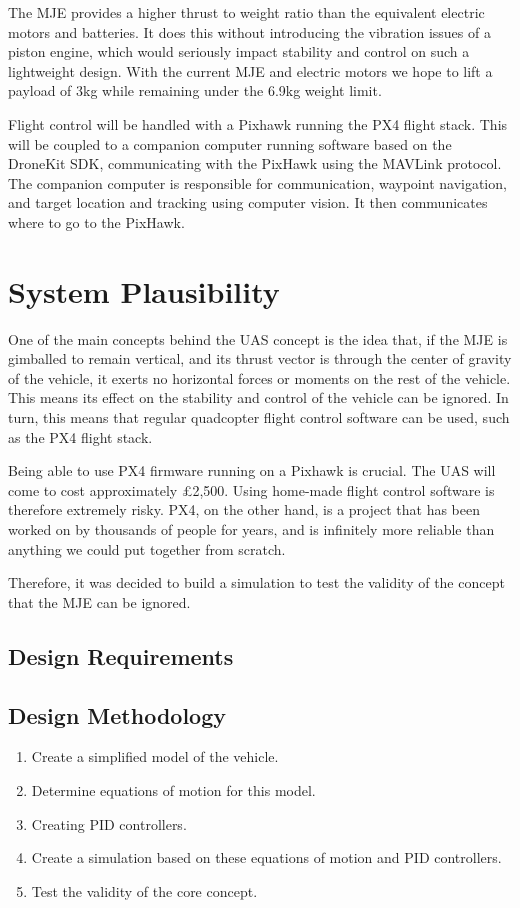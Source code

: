 \documentclass[10pt]{article}
\begin{document}
The MJE provides a higher thrust to weight ratio than the equivalent electric motors and batteries. It does this without introducing the vibration issues of a piston engine, which would seriously impact stability and control on such a lightweight design. With the current MJE and electric motors we hope to lift a payload of 3kg while remaining under the 6.9kg weight limit.

Flight control will be handled with a Pixhawk running the PX4 flight stack. This will be coupled to a companion computer running software based on the DroneKit SDK, communicating with the PixHawk using the MAVLink protocol. The companion computer is responsible for communication, waypoint navigation, and target location and tracking using computer vision. It then communicates where to go to the PixHawk.

\section{System Plausibility}
One of the main concepts behind the UAS concept is the idea that, if the MJE is gimballed to remain vertical, and its thrust vector is through the center of gravity of the vehicle, it exerts no horizontal forces or moments on the rest of the vehicle. This means its effect on the stability and control of the vehicle can be ignored. In turn, this means that regular quadcopter flight control software can be used, such as the PX4 flight stack.

Being able to use PX4 firmware running on a Pixhawk is crucial. The UAS will come to cost approximately \pounds2,500. Using home-made flight control software is therefore extremely risky. PX4, on the other hand, is a project that has been worked on by thousands of people for years, and is infinitely more reliable than anything we could put together from scratch.

Therefore, it was decided to build a simulation to test the validity of the concept that the MJE can be ignored.

\subsection{Design Requirements}
\subsection{Design Methodology}
\begin{enumerate}
    \item Create a simplified model of the vehicle.
    \item Determine equations of motion for this model.
    \item Creating PID controllers.
    \item Create a simulation based on these equations of motion and PID controllers.
    \item Test the validity of the core concept.
\end{enumerate}
\end{document}
